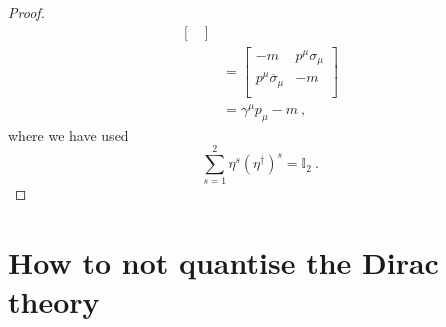 \begin{proof}
\begin{equation*}
\begin{aligned}
\begin{bmatrix}
            \end{bmatrix} \\ & = \begin{bmatrix}
                - m & p^\mu \sigma_\mu \\ p^\mu \overline \sigma_\mu & - m \\
            \end{bmatrix} \\ & = \gamma^\mu p_\mu - m ~,
        \end{aligned}
        \end{equation*}
        where we have used 
        \begin{equation*}
            \sum_{s=1}^{2} \eta^s (\eta^\dagger)^s = \mathbb I_2 ~.
        \end{equation*}
    \end{proof}

\chapter{How to not quantise the Dirac theory}